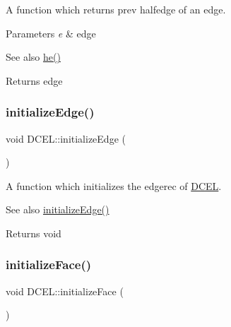 A function which returns prev halfedge of an edge. 


\begin{DoxyParams}{Parameters}
{\em e} & edge \\
\hline
\end{DoxyParams}
\begin{DoxySeeAlso}{See also}
\hyperlink{class_d_c_e_l_abc4ba3118faae5afdebc3a180daa4789}{he()} 
\end{DoxySeeAlso}
\begin{DoxyReturn}{Returns}
edge 
\end{DoxyReturn}
\mbox{\label{class_d_c_e_l_a84cd5349e0eda103a936e104b8cf9017}} 
\subsubsection{\texorpdfstring{initialize\+Edge()}{initializeEdge()}}
{\footnotesize\ttfamily void D\+C\+E\+L\+::initialize\+Edge (\begin{DoxyParamCaption}{ }\end{DoxyParamCaption})\hspace{0.3cm}{\ttfamily [inline]}}



A function which initializes the edgerec of \hyperlink{class_d_c_e_l}{D\+C\+EL}. 

\begin{DoxySeeAlso}{See also}
\hyperlink{class_d_c_e_l_a84cd5349e0eda103a936e104b8cf9017}{initialize\+Edge()} 
\end{DoxySeeAlso}
\begin{DoxyReturn}{Returns}
void 
\end{DoxyReturn}
\mbox{\label{class_d_c_e_l_a886263abba0d84b7e459a6acb5c594ae}} 
\subsubsection{\texorpdfstring{initialize\+Face()}{initializeFace()}}
{\footnotesize\ttfamily void D\+C\+E\+L\+::initialize\+Face (\begin{DoxyParamCaption}{ }\end{DoxyParamCaption})\hspace{0.3cm}{\ttfamily [inline]}}



